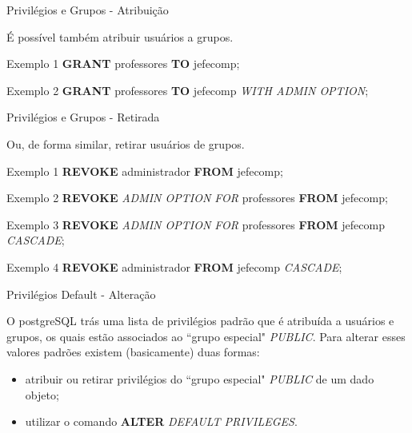 \documentclass[xcolor=x11names,compress]{beamer}
\begin{document}
\begin{frame}{Privilégios e Grupos - Atribuição}

É possível também atribuir usuários a grupos. 

\begin{alertblock}{Exemplo 1}
\textbf{GRANT} professores \textbf{TO} jefecomp;
\end{alertblock}

\begin{alertblock}{Exemplo 2}
\textbf{GRANT} professores \textbf{TO} jefecomp \textit{WITH ADMIN OPTION};
\end{alertblock}

\end{frame}

\begin{frame}{Privilégios e Grupos - Retirada}

Ou, de forma similar, retirar usuários de grupos.

\begin{alertblock}{Exemplo 1}
\textbf{REVOKE} administrador \textbf{FROM} jefecomp;
\end{alertblock}

\begin{alertblock}{Exemplo 2}
\textbf{REVOKE} \textit{ADMIN OPTION FOR} professores \textbf{FROM} jefecomp;
\end{alertblock}

\begin{alertblock}{Exemplo 3}
\textbf{REVOKE} \textit{ADMIN OPTION FOR} professores \textbf{FROM} jefecomp \textit{CASCADE};
\end{alertblock}

\begin{alertblock}{Exemplo 4}
\textbf{REVOKE} administrador \textbf{FROM} jefecomp \textit{CASCADE};
\end{alertblock}

\end{frame}

\begin{frame} {Privilégios Default - Alteração}

O postgreSQL trás uma lista de privilégios padrão que é atribuída a usuários e grupos, os quais estão associados ao ``grupo especial" \textit{PUBLIC}. Para alterar esses valores padrões existem (basicamente) duas formas:

\begin{itemize}
\itemsep 5mm

\item atribuir ou retirar privilégios do ``grupo especial" \textit{PUBLIC} de um dado objeto;

\item utilizar o comando \textbf{ALTER} \textit{DEFAULT PRIVILEGES}.

\end{itemize}

\end{frame}
\end{document}

